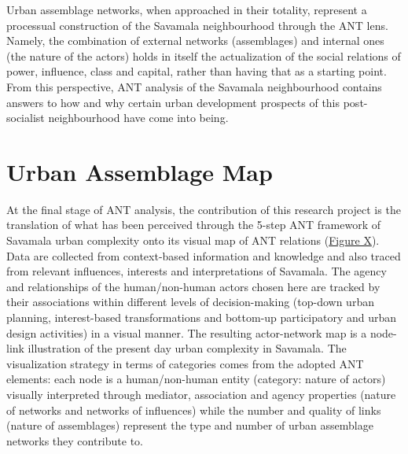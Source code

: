\documentclass[11pt]{report}
\begin{document}
Urban assemblage networks, when approached in their totality, represent a processual construction of the Savamala neighbourhood through the ANT lens. Namely, the combination of external networks (assemblages) and internal ones (the nature of the actors) holds in itself the actualization of the social relations of power, influence, class and capital, rather than having that as a starting point. From this perspective, ANT analysis of the Savamala neighbourhood contains answers to how and why certain urban development prospects of this post-socialist neighbourhood have come into being.


\section{Urban Assemblage Map}

At the final stage of ANT analysis, the contribution of this research project is the translation of what has been perceived through the 5-step ANT framework of Savamala urban complexity onto its visual map of ANT relations (\href{Figure 9 ANT diagram}{Figure X}). 
\\

Data are collected from context-based information and knowledge and also traced from relevant influences, interests and interpretations of Savamala. The agency and relationships of the human/non-human actors chosen here are tracked by their associations within different levels of decision-making (top-down urban planning, interest-based transformations and bottom-up participatory and urban design activities) in a visual manner. The resulting actor-network map is a node-link illustration of the present day urban complexity in Savamala.  The visualization strategy in terms of categories comes from the adopted ANT elements:  each node is a human/non-human entity (category:  nature of actors) visually interpreted through mediator, association and agency properties (nature of networks and networks of influences) while the number and quality of links (nature of assemblages) represent the type and number of urban assemblage networks they contribute to.
\\
\end{document}
